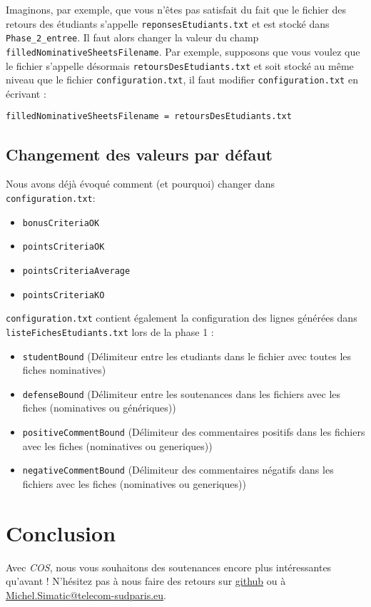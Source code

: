\documentclass[11pt]{article}
\begin{document}
Imaginons, par exemple, que vous n'êtes pas satisfait du fait que le
fichier des retours des étudiants s'appelle \verb~reponsesEtudiants.txt~ et
est stocké dans \verb~Phase_2_entree~. Il faut alors changer la valeur du
champ \verb~filledNominativeSheetsFilename~. Par exemple, supposons que
vous voulez que le fichier s'appelle désormais
\verb~retoursDesEtudiants.txt~ et soit stocké au même niveau que le fichier
\verb~configuration.txt~, il faut modifier \verb~configuration.txt~ en
écrivant :

\verb~filledNominativeSheetsFilename = retoursDesEtudiants.txt~
\subsection{Changement des valeurs par défaut}
\label{sec-7-2}
Nous avons déjà évoqué comment (et pourquoi) changer dans
\verb~configuration.txt~:
\begin{itemize}
\item \verb~bonusCriteriaOK~
\item \verb~pointsCriteriaOK~
\item \verb~pointsCriteriaAverage~
\item \verb~pointsCriteriaKO~
\end{itemize}

\verb~configuration.txt~ contient également la configuration des lignes
générées dans \verb~listeFichesEtudiants.txt~ lors de la phase 1 :
\begin{itemize}
\item \verb~studentBound~ (Délimiteur entre les etudiants dans le fichier avec
toutes les fiches nominatives)
\item \verb~defenseBound~ (Délimiteur entre les soutenances dans les fichiers
avec les fiches (nominatives ou génériques))
\item \verb~positiveCommentBound~ (Délimiteur des commentaires positifs dans
les fichiers avec les fiches (nominatives ou generiques))
\item \verb~negativeCommentBound~ (Délimiteur des commentaires négatifs dans
les fichiers avec les fiches (nominatives ou generiques))
\end{itemize}
\section{Conclusion}
\label{sec-8}
Avec \emph{COS}, nous vous souhaitons des soutenances encore plus
intéressantes qu'avant ! N'hésitez pas à nous faire des retours sur
 \href{https://github.com/simatic/COS}{github} ou à \href{mailto:Michel.Simatic@telecom-sudparis.eu}{Michel.Simatic@telecom-sudparis.eu}.
\end{document}
